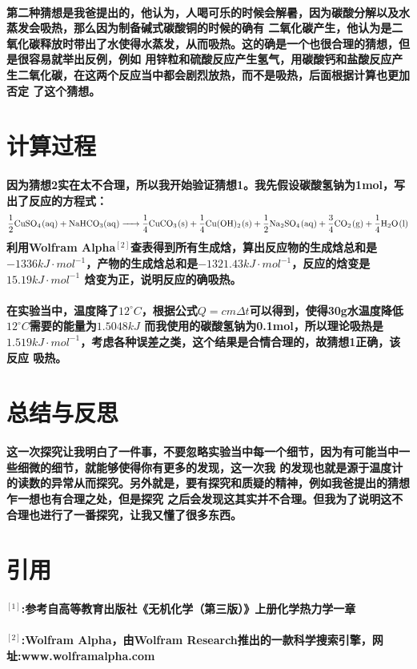 \documentclass[final,11pt,oneside,UTF8]{report}
\begin{document}
\paragraph{
    第二种猜想是我爸提出的，他认为，人喝可乐的时候会解暑，因为碳酸分解以及水蒸发会吸热，那么因为制备碱式碳酸铜的时候的确有
    二氧化碳产生，他认为是二氧化碳释放时带出了水使得水蒸发，从而吸热。这的确是一个也很合理的猜想，但是很容易就举出反例，例如
    用锌粒和硫酸反应产生氢气，用碳酸钙和盐酸反应产生二氧化碳，在这两个反应当中都会剧烈放热，而不是吸热，后面根据计算也更加否定
    了这个猜想。
}
\section{计算过程}
\paragraph{
    因为猜想2实在太不合理，所以我开始验证猜想1。我先假设碳酸氢钠为1mol，写出了反应的方程式：
    $$\ce{\frac{1}{2}CuSO4(aq) + NaHCO3(aq) -> \frac{1}{4}CuCO3(s) + \frac{1}{4}Cu(OH)2(s) + \frac{1}{2}Na2SO4(aq) + \frac{3}{4}CO2(g) + \frac{1}{4}H2O(l)}$$
    利用Wolfram Alpha$^{[2]}$查表得到所有生成焓，算出反应物的生成焓总和是
    $-1336kJ\cdot mol^{-1}$，产物的生成焓总和是$-1321.43kJ\cdot mol^{-1}$，反应的焓变是$15.19kJ\cdot mol^{-1}$
    焓变为正，说明反应的确吸热。
}
\paragraph{
    在实验当中，温度降了$12^\circ C$，根据公式$Q=cm\Delta t$可以得到，使得30g水温度降低$12^\circ C$需要的能量为$1.5048kJ$
    而我使用的碳酸氢钠为0.1mol，所以理论吸热是$1.519kJ\cdot mol^{-1}$，考虑各种误差之类，这个结果是合情合理的，故猜想1正确，该反应
    吸热。
}
\section{总结与反思}
\paragraph{
    这一次探究让我明白了一件事，不要忽略实验当中每一个细节，因为有可能当中一些细微的细节，就能够使得你有更多的发现，这一次我
    的发现也就是源于温度计的读数的异常从而探究。另外就是，要有探究和质疑的精神，例如我爸提出的猜想乍一想也有合理之处，但是探究
    之后会发现这其实并不合理。但我为了说明这不合理也进行了一番探究，让我又懂了很多东西。
}
\section{引用}
\paragraph{$^{[1]}$:参考自高等教育出版社《无机化学（第三版）》上册化学热力学一章}
\paragraph{$^{[2]}$:Wolfram Alpha，由Wolfram Research推出的一款科学搜索引擎，网址:www.wolframalpha.com}
\end{document}
